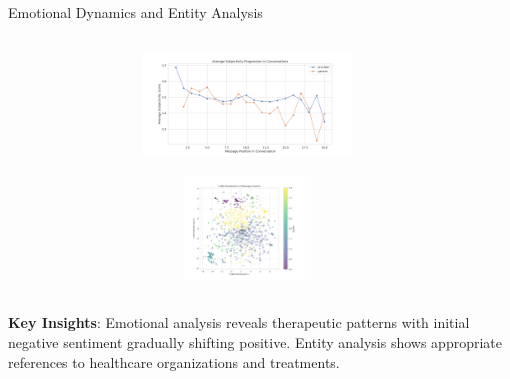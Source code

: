 \begin{frame}{Emotional Dynamics and Entity Analysis}
\begin{columns}
    \begin{column}{0.5\textwidth}
        \begin{minipage}{\textwidth}
              \includegraphics[width=0.95\textwidth, height=2.8cm]{images/analysis/plots_advanced/subjectivity_progression.png}
          \end{minipage}
          \begin{minipage}{\textwidth}
            \includegraphics[width=0.95\textwidth, height=2.8cm]{images/analysis/plots_advanced/tsne_clusters.png}
          \end{minipage}
        \end{column}
  \end{columns}
  \vspace{0.3cm}
  \footnotesize\textbf{Key Insights}: Emotional analysis reveals therapeutic patterns with initial negative sentiment gradually shifting positive. Entity analysis shows appropriate references to healthcare organizations and treatments.
\end{frame}

